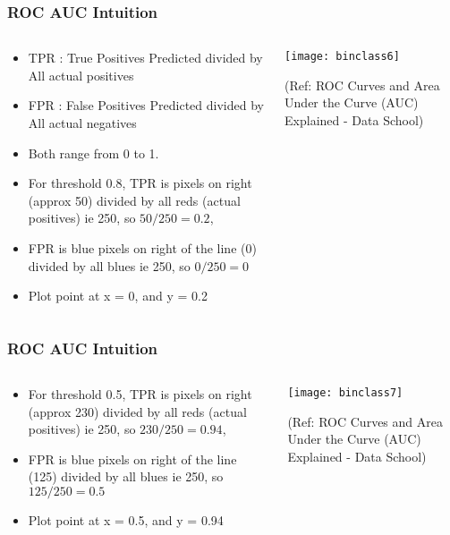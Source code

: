 \begin{frame}[fragile]\frametitle{ROC AUC Intuition}

\begin{columns}
\begin{column}[T]{0.5\linewidth}
\begin{itemize}
\item TPR : True Positives Predicted divided by All actual positives
\item FPR : False Positives Predicted divided by All actual negatives
\item Both range from 0 to 1.
\item For threshold 0.8, TPR is pixels on right (approx 50) divided by all reds (actual positives) ie 250, so $50/250 = 0.2$,
\item FPR is blue pixels on right of the line (0) divided by all blues ie 250, so $0/250 = 0$
\item Plot point at x = 0, and y = 0.2
\end{itemize}
\end{column}
\begin{column}[T]{0.5\linewidth}

\begin{center}
\texttt{[image: binclass6]}
\end{center}

\tiny{(Ref: ROC Curves and Area Under the Curve (AUC) Explained - Data School)}
\end{column}

\end{columns}
\end{frame}


\begin{frame}[fragile]\frametitle{ROC AUC Intuition}

\begin{columns}
\begin{column}[T]{0.5\linewidth}
\begin{itemize}
\item For threshold 0.5, TPR is pixels on right (approx 230) divided by all reds (actual positives) ie 250, so $230/250 = 0.94$,
\item FPR is blue pixels on right of the line (125) divided by all blues ie 250, so $125/250 = 0.5$
\item Plot point at x = 0.5, and y = 0.94
\end{itemize}
\end{column}
\begin{column}[T]{0.5\linewidth}

\begin{center}
\texttt{[image: binclass7]}
\end{center}

\tiny{(Ref: ROC Curves and Area Under the Curve (AUC) Explained - Data School)}
\end{column}

\end{columns}
\end{frame}

